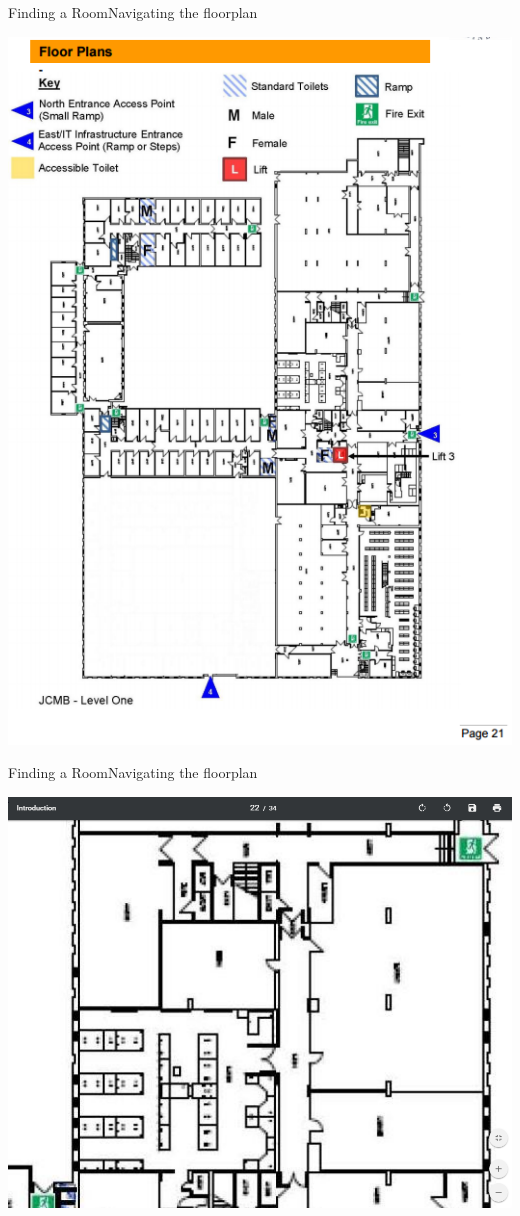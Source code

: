 \documentclass{beamer}
\begin{document}
\begin{frame}{Finding a Room}{Navigating the floorplan}
  \centerline{\includegraphics[height=0.8\textheight]{pdf2.png}}
\end{frame}

\begin{frame}{Finding a Room}{Navigating the floorplan}
  \centerline{\includegraphics[height=0.8\textheight]{pdf3.png}}
\end{frame}
\end{document}
